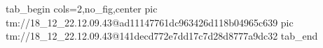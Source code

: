  
 
 
 
 

\qqSecCmtScr


\ifcmt
  tab_begin cols=2,no_fig,center
    pic tm://18_12_22.12.09.43@ad11147761dc963426d118b04965c639
    pic tm://18_12_22.12.09.43@141decd772e7dd17c7d28d8777a9dc32
  tab_end
\fi

